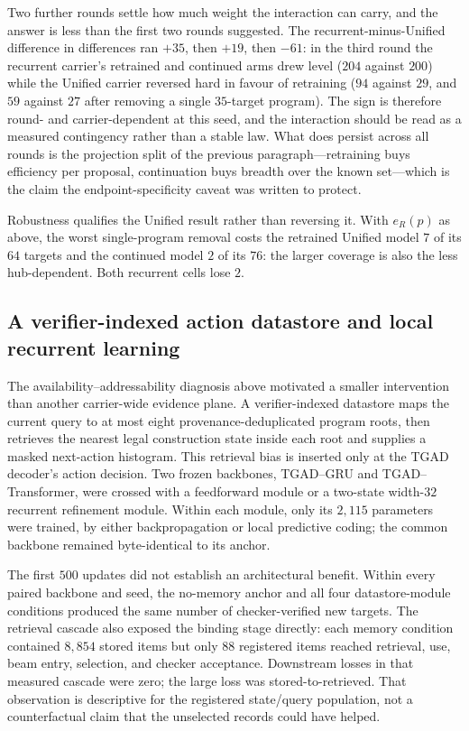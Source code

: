 \documentclass[11pt]{article}
\begin{document}
Two further rounds settle how much weight the interaction can carry, and the answer is
less than the first two rounds suggested. The recurrent-minus-Unified difference in
differences ran $+35$, then $+19$, then $-61$: in the third round the recurrent carrier's
retrained and continued arms drew level ($204$ against $200$) while the Unified carrier
reversed hard in favour of retraining ($94$ against $29$, and $59$ against $27$ after
removing a single $35$-target program). The sign is therefore round- and
carrier-dependent at this seed, and the interaction should be read as a measured
contingency rather than a stable law. What does persist across all rounds is the
projection split of the previous paragraph---retraining buys efficiency per proposal,
continuation buys breadth over the known set---which is the claim the endpoint-specificity
caveat was written to protect.

Robustness qualifies the Unified result rather than reversing it. With $e_R(p)$ as above,
the worst single-program removal costs the retrained Unified model $7$ of its $64$ targets
and the continued model $2$ of its $76$: the larger coverage is also the less
hub-dependent. Both recurrent cells lose $2$.

\subsection{A verifier-indexed action datastore and local recurrent learning}
\label{sec:tgad-action-datastore}

The availability--addressability diagnosis above motivated a smaller intervention than
another carrier-wide evidence plane.  A verifier-indexed datastore maps the current query
to at most eight provenance-deduplicated program roots, then retrieves the nearest legal
construction state inside each root and supplies a masked next-action histogram.  This
retrieval bias is inserted only at the TGAD decoder's action decision.  Two frozen
backbones, TGAD--GRU and TGAD--Transformer, were crossed with a feedforward module or a
two-state width-$32$ recurrent refinement module.  Within each module, only its $2{,}115$
parameters were trained, by either backpropagation or local predictive coding; the common
backbone remained byte-identical to its anchor.

The first $500$ updates did not establish an architectural benefit.  Within every paired
backbone and seed, the no-memory anchor and all four datastore-module conditions produced
the same number of checker-verified new targets.  The retrieval cascade also exposed the
binding stage directly: each memory condition contained $8{,}854$ stored items but only
$88$ registered items reached retrieval, use, beam entry, selection, and checker
acceptance.  Downstream losses in that measured cascade were zero; the large loss was
stored-to-retrieved.  That observation is descriptive for the registered state/query
population, not a counterfactual claim that the unselected records could have helped.
\end{document}
